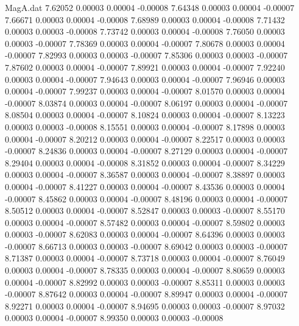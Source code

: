 \begin{filecontents}{MagA.dat}
   7.62052    0.00003    0.00004   -0.00008
   7.64348    0.00003    0.00004   -0.00007
   7.66671    0.00003    0.00004   -0.00008
   7.68989    0.00003    0.00004   -0.00008
   7.71432    0.00003    0.00003   -0.00008
   7.73742    0.00003    0.00004   -0.00008
   7.76050    0.00003    0.00003   -0.00007
   7.78369    0.00003    0.00004   -0.00007
   7.80678    0.00003    0.00004   -0.00007
   7.82993    0.00003    0.00003   -0.00007
   7.85306    0.00003    0.00003   -0.00007
   7.87602    0.00003    0.00004   -0.00007
   7.89921    0.00003    0.00004   -0.00007
   7.92240    0.00003    0.00004   -0.00007
   7.94643    0.00003    0.00004   -0.00007
   7.96946    0.00003    0.00004   -0.00007
   7.99237    0.00003    0.00004   -0.00007
   8.01570    0.00003    0.00004   -0.00007
   8.03874    0.00003    0.00004   -0.00007
   8.06197    0.00003    0.00004   -0.00007
   8.08504    0.00003    0.00004   -0.00007
   8.10824    0.00003    0.00004   -0.00007
   8.13223    0.00003    0.00003   -0.00008
   8.15551    0.00003    0.00004   -0.00007
   8.17898    0.00003    0.00004   -0.00007
   8.20212    0.00003    0.00004   -0.00007
   8.22517    0.00003    0.00003   -0.00007
   8.24836    0.00003    0.00004   -0.00007
   8.27129    0.00003    0.00004   -0.00007
   8.29404    0.00003    0.00004   -0.00008
   8.31852    0.00003    0.00004   -0.00007
   8.34229    0.00003    0.00004   -0.00007
   8.36587    0.00003    0.00004   -0.00007
   8.38897    0.00003    0.00004   -0.00007
   8.41227    0.00003    0.00004   -0.00007
   8.43536    0.00003    0.00004   -0.00007
   8.45862    0.00003    0.00004   -0.00007
   8.48196    0.00003    0.00004   -0.00007
   8.50512    0.00003    0.00004   -0.00007
   8.52847    0.00003    0.00003   -0.00007
   8.55170    0.00003    0.00004   -0.00007
   8.57482    0.00003    0.00004   -0.00007
   8.59802    0.00003    0.00003   -0.00007
   8.62083    0.00003    0.00004   -0.00007
   8.64396    0.00003    0.00003   -0.00007
   8.66713    0.00003    0.00003   -0.00007
   8.69042    0.00003    0.00003   -0.00007
   8.71387    0.00003    0.00004   -0.00007
   8.73718    0.00003    0.00004   -0.00007
   8.76049    0.00003    0.00004   -0.00007
   8.78335    0.00003    0.00004   -0.00007
   8.80659    0.00003    0.00004   -0.00007
   8.82992    0.00003    0.00003   -0.00007
   8.85311    0.00003    0.00003   -0.00007
   8.87642    0.00003    0.00004   -0.00007
   8.89947    0.00003    0.00004   -0.00007
   8.92271    0.00003    0.00004   -0.00007
   8.94695    0.00003    0.00003   -0.00007
   8.97032    0.00003    0.00004   -0.00007
   8.99350    0.00003    0.00003   -0.00008

\end{filecontents}
